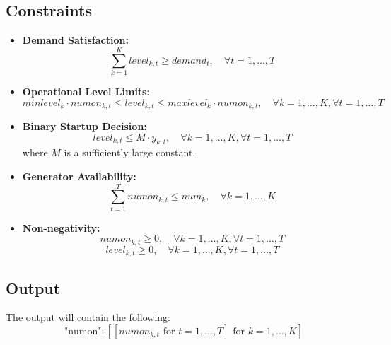 \documentclass{article}
\begin{document}
\subsection*{Constraints}

\begin{itemize}
    \item \textbf{Demand Satisfaction:}
    \[
    \sum_{k=1}^{K} level_{k,t} \geq demand_t, \quad \forall t = 1, \ldots, T
    \]
    
    \item \textbf{Operational Level Limits:}
    \[
    minlevel_k \cdot numon_{k,t} \leq level_{k,t} \leq maxlevel_k \cdot numon_{k,t}, \quad \forall k = 1, \ldots, K, \forall t = 1, \ldots, T
    \]
    
    \item \textbf{Binary Startup Decision:}
    \[
    level_{k,t} \leq M \cdot y_{k,t}, \quad \forall k = 1, \ldots, K, \forall t = 1, \ldots, T
    \]
    where $M$ is a sufficiently large constant.

    \item \textbf{Generator Availability:}
    \[
    \sum_{t=1}^{T} numon_{k,t} \leq num_k, \quad \forall k = 1, \ldots, K
    \]

    \item \textbf{Non-negativity:}
    \[
    numon_{k,t} \geq 0, \quad \forall k = 1, \ldots, K, \forall t = 1, \ldots, T
    \]
    \[
    level_{k,t} \geq 0, \quad \forall k = 1, \ldots, K, \forall t = 1, \ldots, T
    \]
\end{itemize}

\subsection*{Output}
The output will contain the following:
\[
\text{"numon"}: [[numon_{k,t} \text{ for } t = 1,\ldots,T] \text{ for } k = 1,\ldots,K]
\]
\end{document}
